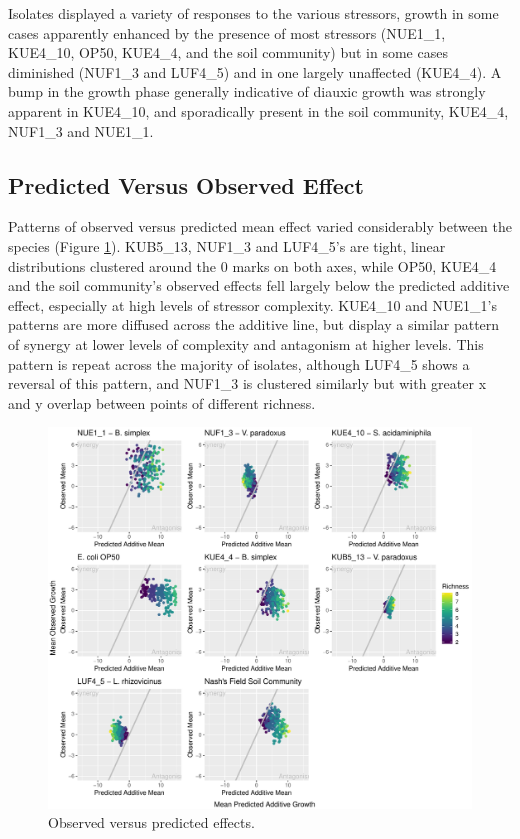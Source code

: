 \documentclass[final,1p,times]{elsarticle}
\begin{document}
Isolates displayed a variety of responses to the various stressors, growth in some cases apparently enhanced by the presence of most stressors (NUE1\_1, KUE4\_10, OP50, KUE4\_4, and the soil community) but in some cases diminished (NUF1\_3 and LUF4\_5) and in one largely unaffected (KUE4\_4). A bump in  the growth phase generally indicative of diauxic growth was strongly apparent in KUE4\_10, and sporadically present in the soil community, KUE4\_4, NUF1\_3 and NUE1\_1. 

\subsection{Predicted Versus Observed Effect}
\label{S:3:4}

Patterns of observed versus predicted mean effect varied considerably between the species (Figure \ref{fig:obsXpred}). KUB5\_13, NUF1\_3 and LUF4\_5’s are tight, linear distributions clustered around the 0 marks on both axes, while OP50, KUE4\_4 and the soil community’s observed effects fell largely below the predicted additive effect, especially at high levels of stressor complexity. KUE4\_10 and NUE1\_1’s patterns are more diffused across the additive line, but display a similar pattern of synergy at lower levels of complexity and antagonism at higher levels. This pattern is repeat across the majority of isolates, although LUF4\_5 shows a reversal of this pattern, and NUF1\_3 is clustered similarly but with greater x and y overlap between points of different richness.

\begin{figure}[ht]
    \centering
    \includegraphics[width = \textwidth]{Scripts/Results/Final_Pipeline/ObservedXPredicted.pdf}
    \caption{Observed versus predicted effects.}
    \label{fig:obsXpred}
\end{figure}
\end{document}
